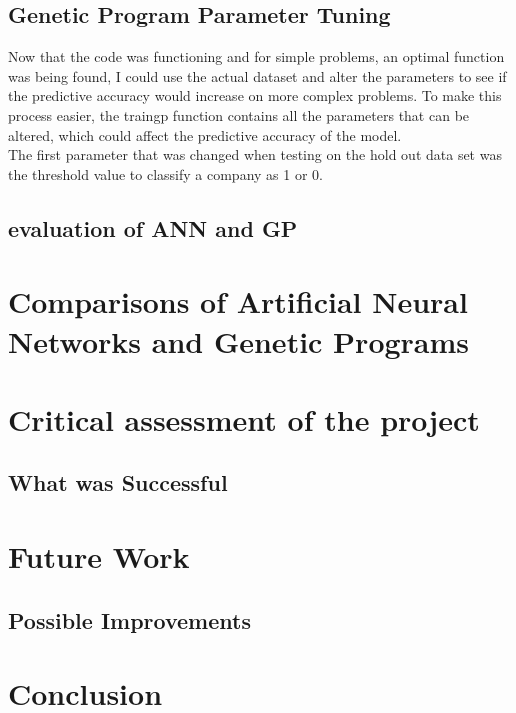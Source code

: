 \documentclass[11pt]{article}
\begin{document}
\subsection{Genetic Program Parameter Tuning}
Now that the code was functioning and for simple problems, an optimal function was being found, I could use the actual dataset and alter the parameters to see if the predictive accuracy would increase on more complex problems. To make this process easier, the train\textunderscore gp function contains all the parameters that can be altered, which could affect the predictive accuracy of the model. \\

The first parameter that was changed when testing on the hold out data set was the threshold value to classify a company as 1 or 0. 




\subsection{evaluation of ANN and GP }

\newpage
\section{Comparisons of Artificial Neural Networks and Genetic Programs}
\newpage
\section{Critical assessment of the project }
\subsection{What was Successful}

\newpage
\section{Future Work}
\subsection{Possible Improvements}

\newpage
\section{Conclusion}
\end{document}
